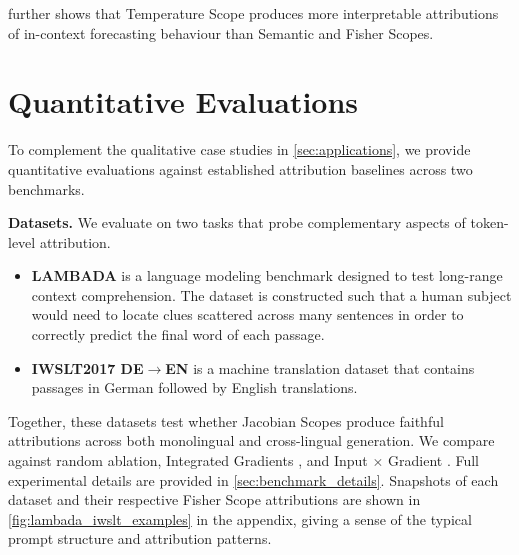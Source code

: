 \documentclass{article}
\begin{document}
 further shows that Temperature Scope produces more interpretable attributions of in-context forecasting behaviour than Semantic and Fisher Scopes.


\section{Quantitative Evaluations}
\label{sec:evaluation}

To complement the qualitative case studies in \cref{sec:applications}, 
we provide quantitative evaluations against established attribution baselines across two benchmarks.

\noindent\textbf{Datasets.}
We evaluate on two tasks that probe complementary aspects of token-level attribution.
\begin{itemize}
    \item \textbf{LAMBADA} \cite{paperno-etal-2016-lambada} is a language modeling benchmark designed to test long-range context comprehension. 
    The dataset is constructed such that a human subject would need to locate clues scattered across many sentences in order to correctly predict the final word of each passage.
    \item \textbf{IWSLT2017 DE$\to$EN} \cite{cettolo-etal-2017-overview} is a machine translation dataset that contains passages in German followed by English translations.

\end{itemize}

Together, these datasets test whether Jacobian Scopes produce faithful attributions across both monolingual and cross-lingual generation.
We compare against random ablation, Integrated Gradients \cite{Sundararajan-Axiomatic-Attribution-DNN-2017}, and Input $\times$ Gradient \cite{shrikumar2017learning,simonyan2013deep}.
Full experimental details are provided in \cref{sec:benchmark_details}.
Snapshots of each dataset and their respective Fisher Scope attributions are shown in \cref{fig:lambada_iwslt_examples} in the appendix, giving a sense of the typical prompt structure and attribution patterns.
\end{document}
